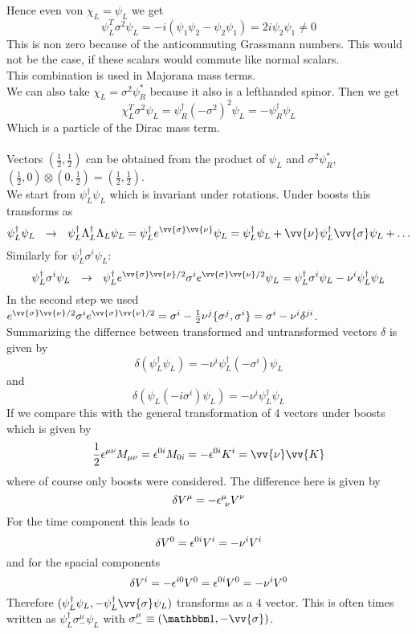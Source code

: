 Hence even von $\chi_L = \psi_L$ we get
\[ \psi_L^T \sigma^2 \psi_L = - i( \psi_1 \psi_2 - \psi_2 \psi_1) = 2i \psi_2 \psi_1 \neq 0\]
This is non zero because of the anticommuting Grassmann numbers. This would not be the case, if these scalars would commute like normal scalars.\\
This combination is used in Majorana mass terms.\\
We can also take $\chi_L = \sigma^2\psi_R^*$ because it also is a lefthanded spinor. Then we get
\[\chi_L^T \sigma^2 \psi_L = \psi^\dagger_R(-\sigma^2)^2 \psi_L = - \psi_R^\dagger \psi_L\]
Which is a particle of the Dirac mass term.\\
\\
Vectors $\left(\frac{1}{2},\frac{1}{2}\right)$ can be obtained from the product of $\psi_L$ and $\sigma^2\psi_R^*$, $\left(\frac{1}{2}, 0 \right) \otimes \left(0,\frac{1}{2}\right) = \left(\frac{1}{2},\frac{1}{2}\right)$. \\
We start from $\psi_L^\dagger \psi_L$ which is invariant under rotations. Under boosts this transforms as 
\[ \psi_L^\dagger \psi_L ~~\df~~ \psi_L^\dagger \Lambda_L^\dagger \Lambda_L \psi_L = \psi_L^\dagger e^{\vv{\sigma}\vv{\nu}} \psi_L = \psi_L^\dagger \psi_L + \vv{\nu} \psi_L^\dagger \vv{\sigma} \psi_L + \ldots\]
Similarly for $\psi_L^\dagger \sigma^i \psi_L$:
\[ \psi_L^\dagger \sigma^i \psi_L ~~\df~~ \psi_L^\dagger e^{\vv{\sigma}\vv{\nu}/2} \sigma^i e^{\vv{\sigma}\vv{\nu}/2} \psi_L = \psi_L^\dagger \sigma^i \psi_L - \nu^i \psi_L^\dagger \psi_L\]
In the second step we used $e^{\vv{\sigma}\vv{\nu}/2} \sigma^i e^{\vv{\sigma}\vv{\nu}/2} = \sigma^i - \frac{1}{2} \nu^j \{\sigma^j,\sigma^i\} = \sigma^i - \nu^i \delta^{ji}$.\\
Summarizing the differnce between transformed and untransformed vectors $\delta$ is given by
\[ \delta(\psi_L^\dagger \psi_L) = - \nu^i \psi_L^\dagger (-\sigma^i) \psi_L\]
and
\[ \delta( \psi_L(-i\sigma^i) \psi_L) = -\nu^i \psi^\dagger_L \psi_L\]
If we compare this with the general transformation of 4 vectors under boosts which is given by
\[ \frac{1}{2} \eps^{\mu\nu} M_{\mu\nu} = \eps^{0i} M_{0i} = - \eps^{0i}K^i = \vv{\nu}\vv{K} \]
where of course only boosts were considered. The difference here is given by
\[ \delta V^\mu = - \epsilon^\mu_{~\nu} V^\nu\]
For the time component this leads to
\[ \delta V^0 = \epsilon^{0i} V^i = - \nu^i V^i\]
and for the spacial components
\[ \delta V^i = - \epsilon^{i0} V^0 = \epsilon^{0i} V^0 =  -\nu^i V^0\]
Therefore $( \psi_L^\dagger \psi_L, - \psi_L^\dagger \vv{\sigma} \psi_L)$ transforms as a 4 vector. This is often times written as $\psi_L ^\dagger \sigma_-^\mu \psi_L$ with $\sigma_-^\mu \equiv (\ehm, - \vv{\sigma})$.\\
